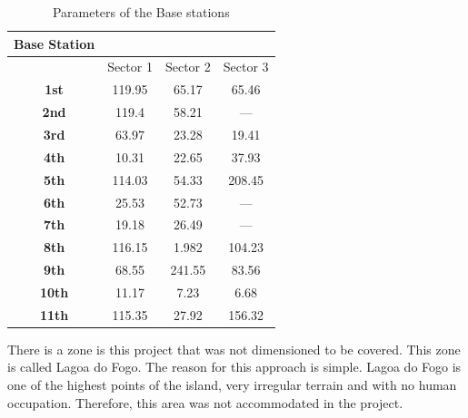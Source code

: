 \documentclass[letterpaper, 10 pt, conference]{ieeeconf}  %
\begin{document}
\begin{table}[h]
\centering
\begin{tabular}{|c|c|c|c|}
\hline
\rowcolor[HTML]{EFEFEF} 
{\color[HTML]{000000} \textbf{Base Station}} & \multicolumn{3}{c|}{\cellcolor[HTML]{EFEFEF}{\color[HTML]{000000} \textbf{Transmitted Power (W)}}}     \\ \hline
                                             & \cellcolor[HTML]{FD6864}Sector 1 & \cellcolor[HTML]{96FFFB}Sector 2 & \cellcolor[HTML]{FFFE65}Sector 3 \\ \hline
\textbf{1st}                                 & 119.95                           & 65.17                            & 65.46                            \\ \hline
\textbf{2nd}                                 & 119.4                            & 58.21                            & —                                \\ \hline
\textbf{3rd}                                 & 63.97                            & 23.28                            & 19.41                            \\ \hline
\textbf{4th}                                 & 10.31                            & 22.65                            & 37.93                            \\ \hline
\textbf{5th}                                 & 114.03                           & 54.33                            & 208.45                           \\ \hline
\textbf{6th}                                 & 25.53                            & 52.73                            & —                                \\ \hline
\textbf{7th}                                 & 19.18                            & 26.49                            & —                                \\ \hline
\textbf{8th}                                 & 116.15                           & 1.982                            & 104.23                           \\ \hline
\textbf{9th}                                 & 68.55                            & 241.55                           & 83.56                            \\ \hline
\textbf{10th}                                & 11.17                            & 7.23                             & 6.68                             \\ \hline
\textbf{11th}                                & 115.35                           & 27.92                            & 156.32                           \\ \hline
\end{tabular}
\caption{Parameters of the Base stations}
\label{tab:BS}
\end{table}\par\noindent 
There is a zone is this project that was not dimensioned to be covered.  This zone is called Lagoa do Fogo. The reason for this approach is simple. Lagoa do Fogo is one of the highest points of the island, very irregular terrain and with no human occupation. Therefore, this area was not accommodated in the project.
\end{document}
